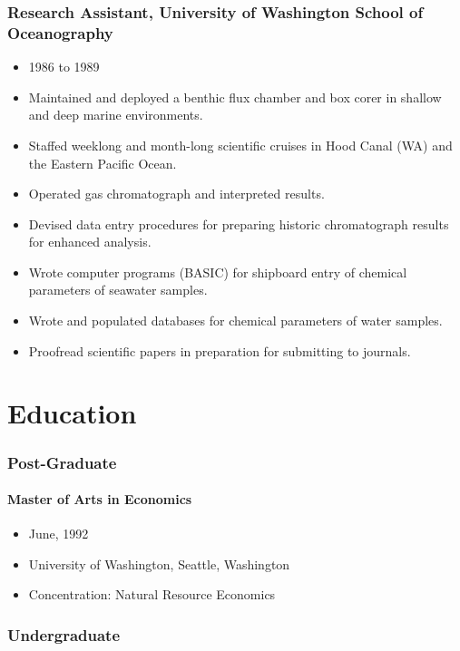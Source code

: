 \documentclass[12pt]{article}
\begin{document}
\subsubsection{Research Assistant, University of Washington School of Oceanography}

\begin{itemize}
\item 1986 to 1989
\item
  Maintained and deployed a benthic flux chamber and box corer in
  shallow and deep marine environments.
\item
  Staffed weeklong and month-long scientific cruises in Hood Canal (WA)
  and the Eastern Pacific Ocean.
\item
  Operated gas chromatograph and interpreted results.
\item
  Devised data entry procedures for preparing historic chromatograph
  results for enhanced analysis.
\item
  Wrote computer programs (BASIC) for shipboard entry of chemical
  parameters of seawater samples.
\item
  Wrote and populated databases for chemical parameters of water
  samples.
\item
  Proofread scientific papers in preparation for submitting to journals.
\end{itemize}

\section {Education}

\subsubsection{Post-Graduate}

\paragraph{Master of Arts in Economics}

\begin{itemize}

\item
  June, 1992
\item
  University of Washington, Seattle, Washington
\item
  Concentration: Natural Resource Economics
\end{itemize}

\subsubsection{Undergraduate}
\end{document}
